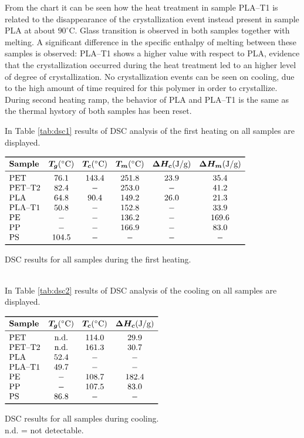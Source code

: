 \documentclass[a4paper, 11pt]{article}
\begin{document}
From the chart it can be seen how the heat treatment in sample PLA–T1 is related to the disappearance of the crystallization event instead present in sample PLA at about $90^\circ$C. Glass transition is observed in both samples together with melting. A significant difference in the specific enthalpy of melting between these samples is observed: PLA–T1 shows a higher value with respect to PLA, evidence that the crystallization occurred during the heat treatment led to an higher level of degree of crystallization. No crystallization events can be seen on cooling, due to the high amount of time required for this polymer in order to crystallize. During second heating ramp, the behavior of PLA and PLA–T1 is the same as the thermal hystory of both samples has been reset.

\newpage

In Table \ref{tab:dsc1} results of DSC analysis of the first heating on all samples are displayed. 
\begin{table}[htp]
\centering
$
\begin{array}{lccccc}
\toprule
\textbf{Sample} & \bm{T_{g}} (\SI{}{\celsius}) & \bm{T_{c}} (\SI{}{\celsius}) & \bm{T_m} (\SI{}{\celsius}) & \bm{\Delta H_{c}} (\si{J/g}) & \bm{\Delta H_m} (\si{J/g}) \\
\midrule
\text{PET} & 76.1 & 143.4 & 251.8 & 23.9 & 35.4 \\
\text{PET–T2} & 82.4 & - & 253.0 & - & 41.2 \\
\text{PLA} & 64.8 & 90.4 & 149.2 & 26.0 & 21.3  \\
\text{PLA–T1} & 50.8 & - & 152.8 & - & 33.9 \\
\text{PE} & - & - & 136.2 & - & 169.6  \\
\text{PP} & - & - & 166.9 & - & 83.0  \\
\text{PS} & 104.5 & - & - & - & -  \\
\bottomrule
\end{array}
$
\caption{DSC results for all samples during the first heating.}
\label{tab:dsc1}
\end{table}\\
In Table \ref{tab:dsc2} results of DSC analysis of the cooling on all samples are displayed. 
\begin{table}[htp]
\centering
$
\begin{array}{lccc}
\toprule
\textbf{Sample} & \bm{T_{g}} (\SI{}{\celsius}) & \bm{T_{c}} (\SI{}{\celsius}) & \bm{\Delta H_{c}} (\si{J/g}) \\
\midrule
\text{PET} & \text{n.d.} & 114.0 & 29.9 \\
\text{PET–T2} & \text{n.d.} & 161.3 & 30.7 \\
\text{PLA} & 52.4 & - & -  \\
\text{PLA–T1} & 49.7 & - & -  \\
\text{PE} & - & 108.7 & 182.4   \\
\text{PP} & - & 107.5 & 83.0   \\
\text{PS} & 86.8 & - & -  \\
\bottomrule
\end{array}
$
\caption{DSC results for all samples during cooling. \\n.d. = not detectable.}
\label{tab:dsc2}
\end{table}
\end{document}
